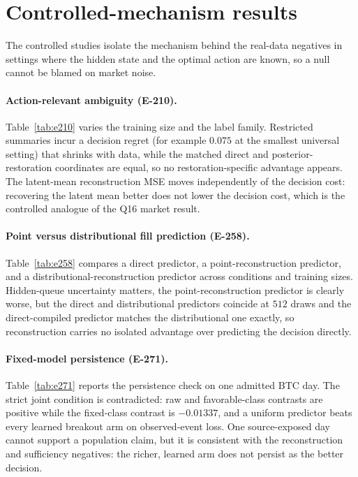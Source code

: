 \section{Controlled-mechanism results}
\label{app:controlled}

The controlled studies isolate the mechanism behind the real-data negatives in settings where
the hidden state and the optimal action are known, so a null cannot be blamed on market noise.

\paragraph{Action-relevant ambiguity (E-210).} Table~\ref{tab:e210} varies the training size
and the label family. Restricted summaries incur a decision regret (for example $0.075$ at the
smallest universal setting) that shrinks with data, while the matched direct and
posterior-restoration coordinates are equal, so no restoration-specific advantage appears. The
latent-mean reconstruction MSE moves independently of the decision cost: recovering the latent
mean better does not lower the decision cost, which is the controlled analogue of the Q16
market result.



\paragraph{Point versus distributional fill prediction (E-258).} Table~\ref{tab:e258} compares a
direct predictor, a point-reconstruction predictor, and a distributional-reconstruction
predictor across conditions and training sizes. Hidden-queue uncertainty matters, the
point-reconstruction predictor is clearly worse, but the direct and distributional predictors
coincide at $512$ draws and the direct-compiled predictor matches the distributional one
exactly, so reconstruction carries no isolated advantage over predicting the decision directly.



\paragraph{Fixed-model persistence (E-271).} Table~\ref{tab:e271} reports the persistence check
on one admitted BTC day. The strict joint condition is contradicted: raw and favorable-class
contrasts are positive while the fixed-class contrast is $-0.01337$, and a uniform predictor
beats every learned breakout arm on observed-event loss. One source-exposed day cannot support a
population claim, but it is consistent with the reconstruction and sufficiency negatives: the
richer, learned arm does not persist as the better decision.


